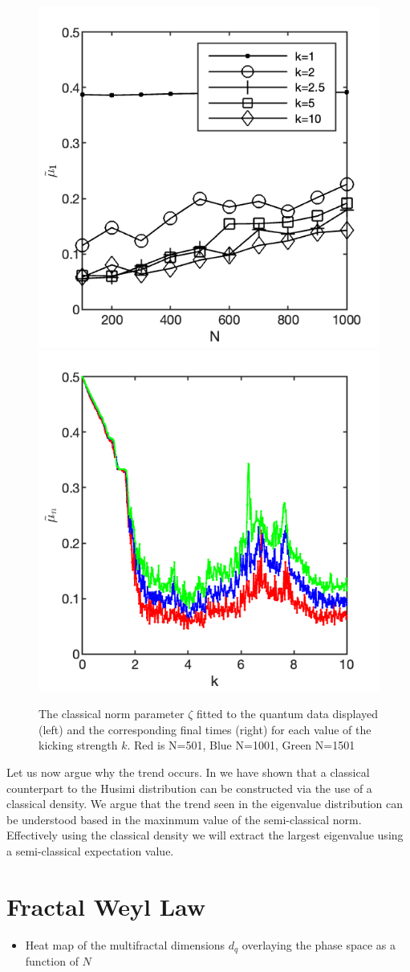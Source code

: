 \documentclass{iopart}
\begin{document}
\begin{figure}[h!]
	\centering
	{\includegraphics[width=0.45\linewidth]{max_imag_N100_to_N1000_kvals_2x3}}
	{\includegraphics[width=0.45\linewidth]{kick_plot_N500_1000_1500_2x3}}
	\caption{The classical norm parameter $\zeta$ fitted to the quantum data displayed (left) and the corresponding final times (right) for each value of the kicking strength $k$. Red is N=501, Blue N=1001, Green N=1501}
	\label{fig:scale_largest_imag}
\end{figure}

Let us now argue why the trend occurs. In \cite{me} we have shown that a classical counterpart to the Husimi distribution can be constructed via the use of a classical density. We argue that the trend seen in the eigenvalue distribution can be understood based in the maxinmum value of the semi-classical norm. Effectively using the classical density we will extract the largest eigenvalue using a semi-classical expectation value.






\section{Fractal Weyl Law}	

\begin{itemize}
	\item Heat map of the multifractal dimensions $d_q$  overlaying the phase space as a function of $N$
\end{itemize}
\end{document}
